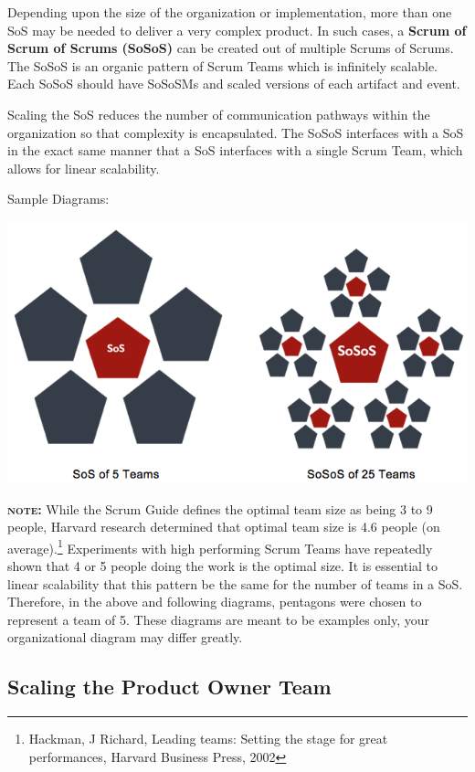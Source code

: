\documentclass[12pt,a4paper,parskip=full]{scrartcl}
\begin{document}
Depending upon the size of the organization or implementation, more than one SoS may be needed to deliver a very complex product. In such cases, a \textbf{Scrum of Scrum of Scrums (SoSoS)} can be created out of multiple Scrums of Scrums. The SoSoS is an organic pattern of Scrum Teams which is infinitely scalable. Each SoSoS should have SoSoSMs and scaled versions of each artifact and event.

Scaling the SoS reduces the number of communication pathways within the organization so that complexity is encapsulated. The SoSoS interfaces with a SoS in the exact same manner that a SoS interfaces with a single Scrum Team, which allows for linear scalability.

Sample Diagrams:

\includegraphics[width=1.0\linewidth]{Sos-R2.png}

\textbf{\textsc{note:}} While the Scrum Guide defines the optimal team size as being 3 to 9 people, Harvard research determined that optimal team size is 4.6 people (on average).\footnote{Hackman, J Richard, Leading teams: Setting the stage for great performances, Harvard Business Press, 2002} Experiments with high performing Scrum Teams have repeatedly shown that 4 or 5 people doing the work is the optimal size. It is essential to linear scalability that this pattern be the same for the number of teams in a SoS. Therefore, in the above and following diagrams, pentagons were chosen to represent a team of 5. These diagrams are meant to be examples only, your organizational diagram may differ greatly.

\subsection{Scaling the Product Owner Team}
\end{document}
